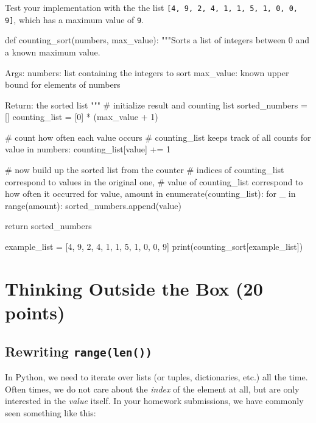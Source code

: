 \vspace{1em}

\noindent Test your implementation with the the list \texttt{[4, 9, 2, 4, 1, 1, 5, 1, 0, 0, 9]}, which has a maximum value of \texttt{9}.

\vspace{1em}

\begin{solution}
    \begin{pythoncode}
def counting_sort(numbers, max_value):
    """Sorts a list of integers between 0 and a known maximum value.

    Args:
        numbers: list containing the integers to sort
        max_value: known upper bound for elements of numbers

    Return:
        the sorted list
    """
    # initialize result and counting list
    sorted_numbers = []
    counting_list = [0] * (max_value + 1)

    # count how often each value occurs
    # counting_list keeps track of all counts
    for value in numbers:
        counting_list[value] += 1

    # now build up the sorted list from the counter
    # indices of counting_list correspond to values in the original one,
    # value of counting_list correspond to how often it occurred
    for value, amount in enumerate(counting_list):
        for _ in range(amount):
            sorted_numbers.append(value)

    return sorted_numbers

example_list = [4, 9, 2, 4, 1, 1, 5, 1, 0, 0, 9]
print(counting_sort[example_list])
    \end{pythoncode}
\end{solution}


\section{Thinking Outside the Box (20 points)}

\subsection{Rewriting \texttt{range(len())}}

In Python, we need to iterate over lists (or tuples, dictionaries, etc.) all the time. Often times, we do not care about the \textit{index} of the element at all, but are only interested in the \textit{value} itself. In your homework submissions, we have commonly seen something like this:

